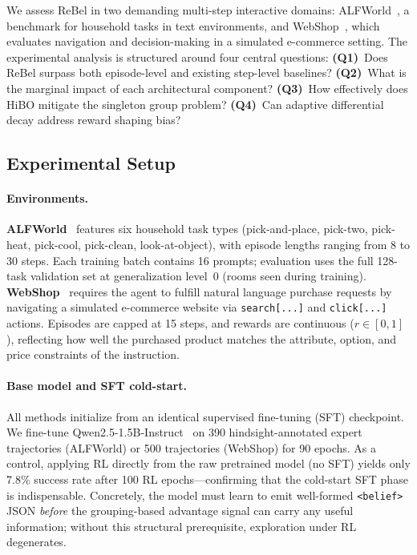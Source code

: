 
We assess ReBel in two demanding multi-step interactive domains:
ALFWorld~\citep{shridhar2021alfworld}, a benchmark for household tasks in text
environments, and WebShop~\citep{yao2022webshop}, which evaluates navigation and
decision-making in a simulated e-commerce setting.
The experimental analysis is structured around four central questions:
\textbf{(Q1)}~Does ReBel surpass both episode-level and existing step-level
baselines?
\textbf{(Q2)}~What is the marginal impact of each architectural component?
\textbf{(Q3)}~How effectively does HiBO mitigate the singleton group problem?
\textbf{(Q4)}~Can adaptive differential decay address reward shaping bias?


\subsection{Experimental Setup}
\label{sec:exp_setup}

\paragraph{Environments.}
\textbf{ALFWorld}~\citep{shridhar2021alfworld} features six household task types
(pick-and-place, pick-two, pick-heat, pick-cool, pick-clean, look-at-object),
with episode lengths ranging from 8 to 30 steps.
Each training batch contains 16 prompts; evaluation uses the full 128-task
validation set at generalization level~0 (rooms seen during training).
\textbf{WebShop}~\citep{yao2022webshop} requires the agent to fulfill natural
language purchase requests by navigating a simulated e-commerce website via
\texttt{search[...]} and \texttt{click[...]} actions.
Episodes are capped at 15 steps, and rewards are continuous ($r \in [0,1]$),
reflecting how well the purchased product matches the attribute, option, and
price constraints of the instruction.

\paragraph{Base model and SFT cold-start.}
All methods initialize from an identical supervised fine-tuning (SFT) checkpoint.
We fine-tune Qwen2.5-1.5B-Instruct~\citep{qwen2.5} on 390 hindsight-annotated
expert trajectories (ALFWorld) or 500 trajectories (WebShop) for 90 epochs.
As a control, applying RL directly from the raw pretrained model (no SFT) yields
only 7.8\% success rate after 100 RL epochs---confirming that the cold-start SFT
phase is indispensable.
Concretely, the model must learn to emit well-formed \texttt{<belief>} JSON
\emph{before} the grouping-based advantage signal can carry any useful information;
without this structural prerequisite, exploration under RL degenerates.

